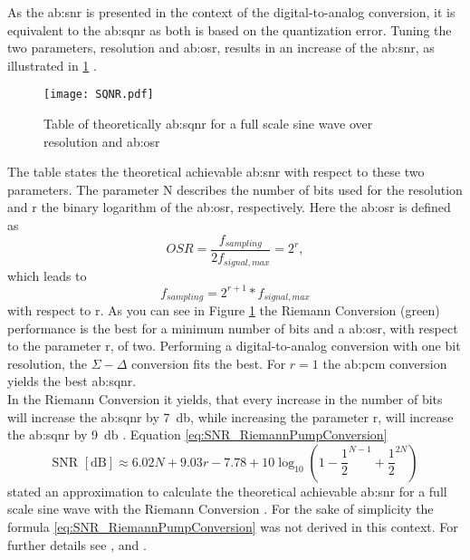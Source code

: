 As the \gls{ab:snr} is presented in the context of the digital-to-analog conversion, it is equivalent to the \gls{ab:sqnr} as both is based on the quantization error.
Tuning the two parameters, resolution and \gls{ab:osr}, results in an increase of the \gls{ab:snr},
as illustrated in \ref{fig:TableSQNR} \cite{DevalRivetVeyrac2015}.

\begin{figure}[ht]
	\centering
  \texttt{[image: SQNR.pdf]}
	\caption{Table of theoretically \gls{ab:sqnr} for a full scale sine wave over resolution and \gls{ab:osr} \cite{DevalRivetVeyrac2015}}
	\label{fig:TableSQNR}
\end{figure}

The table states the theoretical achievable \gls{ab:snr} with respect to these two parameters.
The parameter N describes the number of bits used for the resolution and r the binary logarithm of the \gls{ab:osr}, respectively.
Here the \gls{ab:osr} is defined as
\begin{equation}
OSR =  \frac{f_{sampling}}{2 f_{signal,max}} = 2^r,
\end{equation}
which leads to
\begin{equation}
f_{sampling} =  2^{r+1}*f_{signal,max}
\end{equation}
with respect to r.
As you can see in Figure \ref{fig:TableSQNR} the Riemann Conversion (green) performance is the best for a minimum number of bits and a \gls{ab:osr}, with respect to the parameter r, of two.
Performing a digital-to-analog conversion with one bit resolution, the $\Sigma - \Delta$ conversion fits the best.
For $ r = 1$ the \gls{ab:pcm} conversion yields the best \gls{ab:sqnr}.\\
In the Riemann Conversion it yields, that every increase in the number of bits will increase the \gls{ab:sqnr} by \SI{7}{\decibel}, while increasing the parameter r, will increase the \gls{ab:sqnr} by \SI{9}{\decibel} \cite{VeyracRivetDevalEtAl2016}.
Equation \ref{eq:SNR_RiemannPumpConversion}
\begin{equation}
	\text{SNR } [\si{\dB}] \approx 6.02N + 9.03r - 7.78 + 10\log_{10}(1 - \frac{1}{2}^{N-1} + \frac{1}{2}^{2N})
	\label{eq:SNR_RiemannPumpConversion}
\end{equation}
stated an approximation to calculate the theoretical achievable \gls{ab:snr} for a full scale sine wave with the Riemann Conversion \citep{DevalRivetVeyrac2015}.
For the sake of simplicity the formula \ref{eq:SNR_RiemannPumpConversion} was not derived in this context.
For further details see \cite{VeyracRivetDevalEtAl2014},\cite{VeyracRivetDevalEtAl2016} and \cite{Kester2009}.

